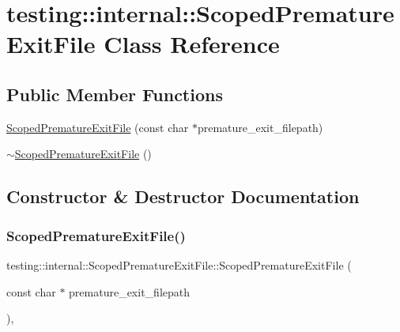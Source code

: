 \hypertarget{classtesting_1_1internal_1_1ScopedPrematureExitFile}{}\section{testing\+::internal\+::Scoped\+Premature\+Exit\+File Class Reference}
\label{classtesting_1_1internal_1_1ScopedPrematureExitFile}
\subsection*{Public Member Functions}
\begin{DoxyCompactItemize}
\item 
\mbox{\hyperlink{classtesting_1_1internal_1_1ScopedPrematureExitFile_ae520883b8a6984a864ce675acedff4a2}{Scoped\+Premature\+Exit\+File}} (const char $\ast$premature\+\_\+exit\+\_\+filepath)
\item 
\mbox{\hyperlink{classtesting_1_1internal_1_1ScopedPrematureExitFile_afa2ddc9bc1c2a90fd0dd82bb11fddc79}{$\sim$\+Scoped\+Premature\+Exit\+File}} ()
\end{DoxyCompactItemize}


\subsection{Constructor \& Destructor Documentation}
\mbox{\label{classtesting_1_1internal_1_1ScopedPrematureExitFile_ae520883b8a6984a864ce675acedff4a2}} 
\subsubsection{\texorpdfstring{ScopedPrematureExitFile()}{ScopedPrematureExitFile()}}
{\footnotesize\ttfamily testing\+::internal\+::\+Scoped\+Premature\+Exit\+File\+::\+Scoped\+Premature\+Exit\+File (\begin{DoxyParamCaption}\item[{const char $\ast$}]{premature\+\_\+exit\+\_\+filepath }\end{DoxyParamCaption})\hspace{0.3cm}{\ttfamily [inline]}, {\ttfamily [explicit]}}

